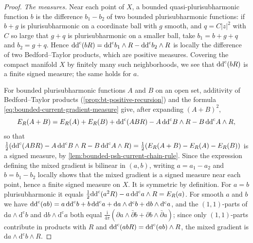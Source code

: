 \begin{proof}
\emph{The measures.} Near each point of $X$, a bounded quasi-plurisubharmonic function $b$ is the difference $b_1-b_2$ of two bounded plurisubharmonic functions: if $b+g$ is plurisubharmonic on a coordinate ball with $g$ smooth, and $q=C|z|^2$ with $C$ so large that $g+q$ is plurisubharmonic on a smaller ball, take $b_1=b+g+q$ and $b_2=g+q$. Hence $\mathrm{dd}^{\mathrm{c}}(bR)=\mathrm{dd}^{\mathrm{c}} b_1\wedge R-\mathrm{dd}^{\mathrm{c}} b_2\wedge R$ is locally the difference of two Bedford--Taylor products, which are positive measures. Covering the compact manifold $X$ by finitely many such neighborhoods, we see that $\mathrm{dd}^{\mathrm{c}}(bR)$ is a finite signed measure; the same holds for $a$.

For bounded plurisubharmonic functions $A$ and $B$ on an open set, additivity of Bedford--Taylor products (\cref{prop:bt-positive-recursion}) and the formula \eqref{eq:bounded-current-gradient-measure} give, after expanding $(A+B)^2$,
\[
 E_R(A+B)=E_R(A)+E_R(B)+\mathrm{dd}^{\mathrm{c}}(ABR)-A\,\mathrm{dd}^{\mathrm{c}} B\wedge R-B\,\mathrm{dd}^{\mathrm{c}} A\wedge R,
\]
so that $\frac12(\mathrm{dd}^{\mathrm{c}}(ABR)-A\,\mathrm{dd}^{\mathrm{c}} B\wedge R-B\,\mathrm{dd}^{\mathrm{c}} A\wedge R)=\frac12(E_R(A+B)-E_R(A)-E_R(B))$ is a signed measure, by \cref{lem:bounded-psh-current-chain-rule}. Since the expression defining the mixed gradient is bilinear in $(a,b)$, writing $a=a_1-a_2$ and $b=b_1-b_2$ locally shows that the mixed gradient is a signed measure near each point, hence a finite signed measure on $X$. It is symmetric by definition. For $a=b$ plurisubharmonic it equals $\frac12\mathrm{dd}^{\mathrm{c}}(a^2R)-a\,\mathrm{dd}^{\mathrm{c}} a\wedge R=E_R(a)$. For smooth $a$ and $b$ we have $\mathrm{dd}^{\mathrm{c}}(ab)=a\,\mathrm{dd}^{\mathrm{c}} b+b\,\mathrm{dd}^{\mathrm{c}} a+\mathrm da\wedge\mathrm d^{\mathrm c}b+\mathrm db\wedge\mathrm d^{\mathrm c}a$, and the $(1,1)$-parts of $\mathrm da\wedge\mathrm d^{\mathrm c}b$ and $\mathrm db\wedge\mathrm d^{\mathrm c}a$ both equal $\frac{\mathrm i}{4\pi}(\partial a\wedge\bar\partial b+\partial b\wedge\bar\partial a)$; since only $(1,1)$-parts contribute in products with $R$ and $\mathrm{dd}^{\mathrm{c}}(abR)=\mathrm{dd}^{\mathrm{c}}(ab)\wedge R$, the mixed gradient is $\mathrm da\wedge\mathrm d^{\mathrm c}b\wedge R$.


\end{proof}

